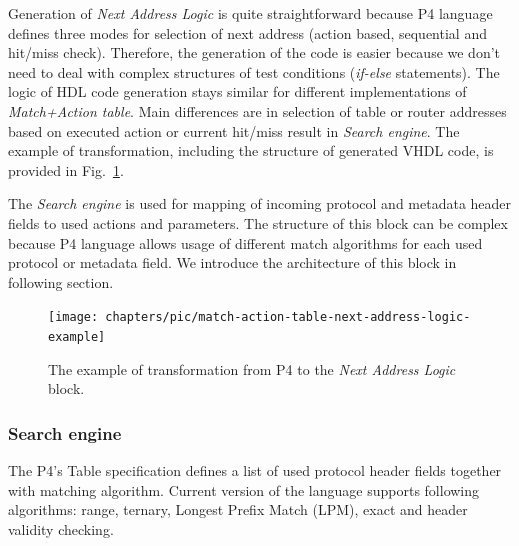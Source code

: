 Generation of \textit{Next Address Logic} is quite straightforward because P4 language defines three modes for selection of next address 
(action based, sequential and hit/miss check). Therefore, the generation of the code is easier because we don't need to deal with
complex structures of test conditions (\textit{if-else} statements). The logic of HDL code generation stays similar for different implementations
of \textit{Match+Action table}. 
Main differences are in selection of table or router addresses based on executed action or current hit/miss result in \textit{Search engine}.
The example of transformation, including the structure of generated VHDL code, is provided in Fig.~\ref{fig:matchActionTableNextAddressLogicExample}.

The \textit{Search engine} is used for mapping of incoming protocol and metadata header fields to used actions and parameters. 
The structure of this block can be complex because P4 language allows usage of different match algorithms for each used protocol or 
metadata field. We introduce the architecture of this block in following section.

\begin{figure}[h]
    \centering
    \texttt{[image: chapters/pic/match-action-table-next-address-logic-example]}
    \caption{The example of transformation from P4 to the \textit{Next Address Logic} block.}
    \label{fig:matchActionTableNextAddressLogicExample}
\end{figure}

\subsubsection{Search engine}
\label{subsubsec:matchActionSearchEngine}
The P4's Table specification defines a list of used 
protocol header fields together with matching algorithm. Current version of the language supports following algorithms:
range, ternary, Longest Prefix Match (LPM), exact and header validity checking. 

